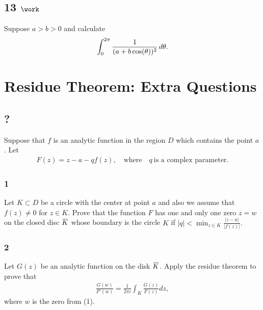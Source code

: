 \hypertarget{work-60}{%
\subsection{\texorpdfstring{13
\(\work\)}{13 \textbackslash work}}\label{work-60}}

Suppose \(a>b>0\) and calculate
\begin{align*}
\int_0^{2\pi} {1 \over (a+b\cos(\theta))^2} \,d\theta
.\end{align*}

\hypertarget{residue-theorem-extra-questions}{%
\section{Residue Theorem: Extra
Questions}\label{residue-theorem-extra-questions}}

\hypertarget{section-10}{%
\subsection{?}\label{section-10}}

Suppose that \(f\) is an analytic function in the region \(D\) which
contains the point \(a\). Let
\begin{align*}F(z)= z-a-qf(z),\quad \text{where}\quad q \ \text{is a complex
parameter}.\end{align*}

\hypertarget{section-11}{%
\subsubsection{1}\label{section-11}}

Let \(K\subset D\) be a circle with the center at point \(a\) and also
we assume that \(f(z)\not =0\) for \(z\in K\). Prove that the function
\(F\) has one and only one zero \(z=w\) on the closed disc
\(\mkern 1.5mu\overline{\mkern-1.5muK\mkern-1.5mu}\mkern 1.5mu\) whose
boundary is the circle \(K\) if
\(\displaystyle{ |q|<\min_{z\in K} \frac{|z-a|}{|f(z)|}.}\)\\

\hypertarget{section-12}{%
\subsubsection{2}\label{section-12}}

Let \(G(z)\) be an analytic function on the disk
\(\mkern 1.5mu\overline{\mkern-1.5muK\mkern-1.5mu}\mkern 1.5mu\). Apply
the residue theorem to prove that
\begin{align*}
\displaystyle{ \frac{G(w)}{F'(w)}=\frac{1}{2\pi i}\int_K \frac{G(z)}{F(z)} dz,}
\end{align*}
where \(w\) is the zero from (1).

